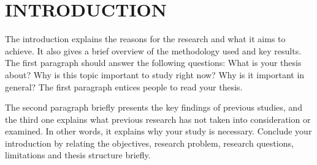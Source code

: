 \chapter{INTRODUCTION}
The introduction explains the reasons for the research and what it aims to achieve. It also gives a brief overview of the methodology used and key results. The first paragraph should answer the following questions: What is your thesis about? Why is this topic important to study right now? Why is it important in general? The first paragraph entices people to read your thesis.

The second paragraph briefly presents the key findings of previous studies, and the third one explains what previous research has not taken into consideration or examined. In other words, it explains why your study is necessary. Conclude your introduction by relating the objectives, research problem, research questions, limitations and thesis structure briefly.
